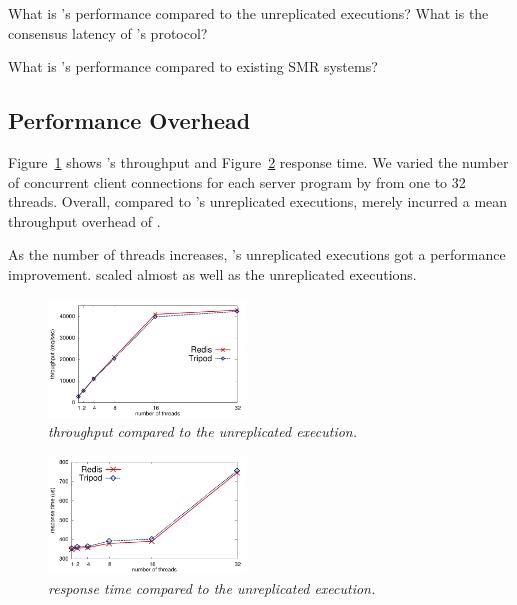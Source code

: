 \begin{tightenum}

\item[\S\ref{sec:overhead}:] What is \xxx's performance compared to the 
unreplicated executions? What is the consensus latency of \xxx's \paxos 
protocol?

\item[\S\ref{sec:compare}:] What is \xxx's performance compared to existing 
SMR systems?



\end{tightenum}

\subsection{Performance Overhead} \label{sec:overhead}

Figure~\ref{fig:tput} shows \xxx's throughput and 
Figure~\ref{fig:latency} response time. We varied the number of concurrent 
client connections for each server program by from one to 32 threads. Overall, 
compared to \redis's unreplicated executions, \xxx merely incurred a mean 
throughput overhead of \tputoverhead.

As the number of threads increases, \redis's unreplicated executions 
got a performance improvement. \xxx scaled almost as well as the unreplicated 
executions.

\begin{figure}[h]
\centering
\includegraphics[width=0.47\textwidth]{figures/throughput}
\caption{\small {\em \xxx throughput compared to the unreplicated 
execution.}}
\label{fig:tput}
\end{figure}
 
\begin{figure}[h]
\centering
\includegraphics[width=0.47\textwidth]{figures/latency}
\caption{\small {\em \xxx response time compared to the unreplicated 
execution.}}
\label{fig:latency}
\end{figure}

